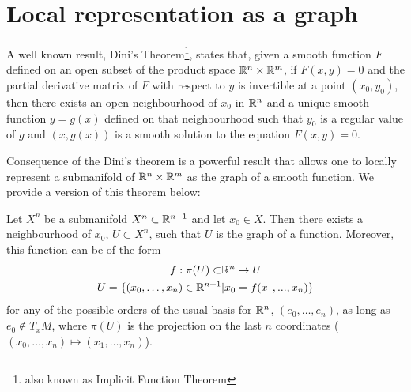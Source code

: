 




\section{Local representation as a graph}

A well known result, Dini's Theorem\footnote{also known as Implicit Function Theorem}, states that, given a smooth function $F$ defined on an open subset of the product space $\mathbb{R}^n \times \mathbb{R}^m$, if $F(x,y) = 0$ and the partial derivative matrix of $F$ with respect to $y$ is invertible at a point $(x_0, y_0)$, then there exists an open neighbourhood of $x_0$ in $\mathbb{R}^n$ and a unique smooth function $y = g(x)$ defined on that neighbourhood such that $y_0$ is a regular value of $g$ and $(x, g(x))$ is a smooth solution to the equation $F(x, y) = 0$.

Consequence of the Dini's theorem is a powerful result that allows one to locally represent a submanifold of $\mathbb{R}^n \times \mathbb{R}^m$ as the graph of a smooth function. We provide a version of this theorem below:

\begin{theorem}
	Let $X^n$ be a submanifold $X^n\subset\mathbb{R}^{n+1}$ and let $x_0\in X$. Then there exists a neighbourhood of $x_0$, $U\subset X^n$, such that $U$ is the graph of a function. 
	Moreover, this function can be of the form 
	\begin{align*}
		f:\pi(U)\subset&\mathbb{R}^n\rightarrow U \\
		U=\{(x_0, \dots, x_n)\in \mathbb{R}^{n+1}&|x_0= f(x_1, ..., x_n)\}
	\end{align*}
	for any of the possible orders of the usual basis for $\mathbb{R}^n$, $(e_0, \dots, e_n)$, as long as $e_0\notin T_xM$, where $\pi(U)$ is the projection on the last $n$ coordinates ($(x_0, \dots, x_n) \mapsto (x_1, \dots, x_n)$). \label{localgraphclassic}
\end{theorem}

